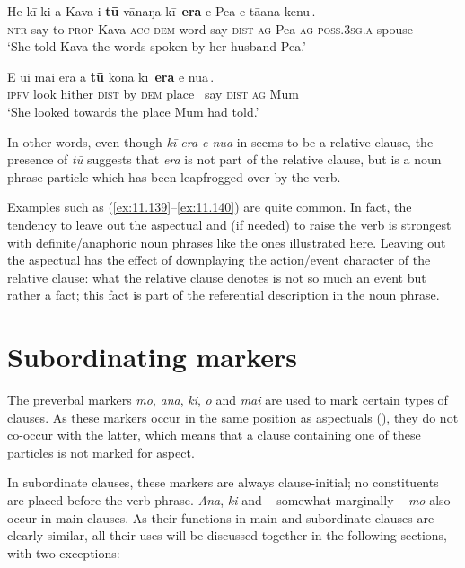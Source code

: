 \ea\label{ex:11.139}
\gll He kī ki a Kava i \textbf{tū} vānaŋa {\ob}kī\,{\cb} \textbf{era} {\ob}e Pea e tā{\ꞌ}ana kenu\,{\cb}. \\
\textsc{ntr} say to \textsc{prop} Kava \textsc{acc} \textsc{dem} word {\db}say \textsc{dist} {\db}\textsc{ag} Pea \textsc{ag} \textsc{poss.3sg.a} spouse \\
\glt 
‘She told Kava the words spoken by her husband Pea.’ \textstyleExampleref{[R229.075]} 
\z

\ea\label{ex:11.140}
\gll E u{\ꞌ}i mai era a \textbf{tū} kona {\ob}kī\,{\cb} \textbf{era} {\ob}e nua\,{\cb}. \\
\textsc{ipfv} look hither \textsc{dist} by \textsc{dem} place ~say \textsc{dist} {\db}\textsc{ag} Mum \\

\glt
‘She looked towards the place Mum had told.’ \textstyleExampleref{[R210.083]} 
\z

In other words, even though \textit{kī era e nua} in  seems to be a relative clause, the presence of \textit{tū} suggests that \textit{era} is not part of the relative clause, but is a noun phrase particle which has been leapfrogged over by the verb.

Examples such as (\ref{ex:11.139}–\ref{ex:11.140}) are quite common. In fact, the tendency to leave out the aspectual and (if needed) to raise the verb is strongest with definite/anaphoric noun phrases like the ones illustrated here. Leaving out the aspectual has the effect of downplaying the action/event character of the relative clause: what the relative clause denotes is not so much an event but rather a fact; this fact is part of the referential description in the noun phrase.
\section{Subordinating markers}\label{sec:11.5}

The preverbal markers \textit{mo}, \textit{ana}, \textit{ki}, \textit{{\ꞌ}o} and \textit{mai} are used to mark certain types of clauses. As these markers occur in the same position as aspectuals (), they do not co-occur with the latter, which means that a clause containing one of these particles is not marked for aspect.

In subordinate clauses, these markers are always clause-initial; no constituents are placed before the verb phrase. \textit{Ana}, \textit{ki} and – somewhat marginally – \textit{mo} also occur in main clauses. As their functions in main and subordinate clauses are clearly similar, all their uses will be discussed together in the following sections, with two exceptions:

